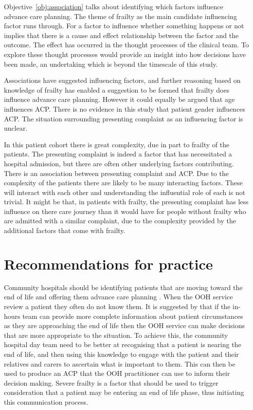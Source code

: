\documentclass
[
	12pt,
	a4paper,
	oneside,
]{report}
\begin{document}
Objective~\ref{obj:association} talks about identifying which factors 
influence advance care planning.
The theme of frailty as the main candidate influencing factor runs through.
For a factor to influence whether something happens or not implies that there 
is a cause and effect relationship between the factor and the outcome. 
The effect has occurred in the thought processes of the clinical team. To 
explore these thought processes would provide an insight into how decisions
have been made, an undertaking which is beyond the timescale of this study.

Associations have suggested influencing factors, and further reasoning based
on knowledge of frailty has enabled a suggestion to be formed that frailty
does influence advance care planning. However it could equally be argued
that age influences ACP. There is no evidence in this study that patient
gender influences ACP. The situation surrounding presenting complaint as
an influencing factor is unclear.

In this patient cohort there is great complexity, due in part to frailty
of the patients. The presenting complaint is indeed a factor that has 
necessitated a hospital admission, but there are often other underlying
factors contributing. There is an association between presenting complaint
and ACP. Due to the complexity of the patients there are likely to be many
interacting factors. These will interact with each other and understanding
the influential role of each is not trivial.
It might be that, in patients with
frailty, the presenting complaint has less influence on there care journey than
it would have for people without frailty who are admitted with a similar
complaint, due to the complexity provided by the additional factors that
come with frailty.

\section{Recommendations for practice}

Community hospitals should be identifying patients that are moving toward the
end of life and offering them advance care planning \parencite{dh:09}.
When the OOH service review a patient they often do not know them. It is 
suggested by \textcite{brettell:18} that if the in-hours team can provide more
complete information about patient circumstances as they are approaching the
end of life then the OOH service can make decisions that are more appropriate
to the situation. To achieve this, the community hospital day team need to be 
better at recognising that a patient is nearing the end of life, and then 
using this knowledge to engage with the patient and their relatives and 
carers to ascertain what is important to them. This can then be used to 
produce an ACP that the OOH practitioner can use to inform their decision
making. Severe frailty is a factor that should be used to trigger consideration
that a patient may be entering an end of life phase, thus initiating this
communication process.
\end{document}
